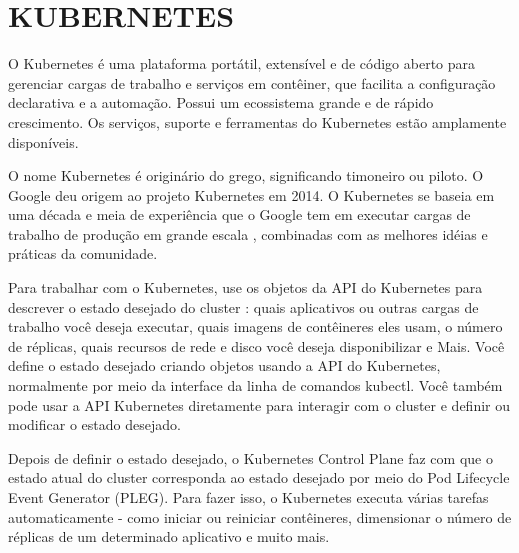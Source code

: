 \chapter{KUBERNETES}
\label{chap:kubernetes}

O Kubernetes é uma plataforma portátil, extensível e de código aberto para gerenciar cargas de trabalho e serviços em contêiner, que facilita a configuração declarativa e a automação. Possui um ecossistema grande e de rápido crescimento. Os serviços, suporte e ferramentas do Kubernetes estão amplamente disponíveis.

O nome Kubernetes é originário do grego, significando timoneiro ou piloto. O Google deu origem ao projeto Kubernetes em 2014. O Kubernetes se baseia em uma década e meia de experiência que o Google tem em executar cargas de trabalho de produção em grande escala , combinadas com as melhores idéias e práticas da comunidade.

Para trabalhar com o Kubernetes, use os objetos da API do Kubernetes para descrever o estado desejado do cluster : quais aplicativos ou outras cargas de trabalho você deseja executar, quais imagens de contêineres eles usam, o número de réplicas, quais recursos de rede e disco você deseja disponibilizar e Mais. Você define o estado desejado criando objetos usando a API do Kubernetes, normalmente por meio da interface da linha de comandos kubectl. Você também pode usar a API Kubernetes diretamente para interagir com o cluster e definir ou modificar o estado desejado.

Depois de definir o estado desejado, o Kubernetes Control Plane faz com que o estado atual do cluster corresponda ao estado desejado por meio do Pod Lifecycle Event Generator (PLEG). Para fazer isso, o Kubernetes executa várias tarefas automaticamente - como iniciar ou reiniciar contêineres, dimensionar o número de réplicas de um determinado aplicativo e muito mais.

